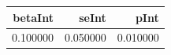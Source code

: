 \begin{tabular}{rrr}
\toprule
betaInt & seInt & pInt \\
\midrule
0.100000 & 0.050000 & 0.010000 \\
\bottomrule
\end{tabular}
